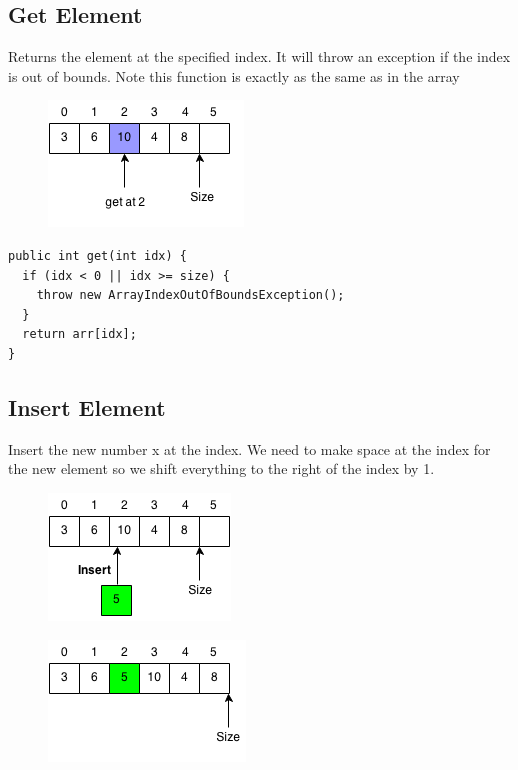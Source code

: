 \documentclass[11pt,oneside]{book}
\makeatletter
\def\maxwidth#1{\ifdim\Gin@nat@width>#1 #1\else\Gin@nat@width\fi}
\makeatother
\begin{document}
\subsection{Get Element}

Returns the element at the specified index. It will throw an exception if the index is out of bounds. Note this function is exactly as the same as in the array

\vspace{5px}\begin{figure}[H]\centering
        \includegraphics[width=0.66\maxwidth{\textwidth}]{vectorget.png}
        \end{figure}

\begin{lstlisting}
public int get(int idx) {
  if (idx < 0 || idx >= size) {
    throw new ArrayIndexOutOfBoundsException();
  }
  return arr[idx];
}
\end{lstlisting}

\subsection{Insert Element}

Insert the new number x at the index. We need to make space at the index for the new element so we shift everything to the right of the index by 1.

\vspace{5px}\begin{figure}[H]\centering
        \includegraphics[width=0.66\maxwidth{\textwidth}]{vectorinsert.png}
        \end{figure}

\vspace{5px}\begin{figure}[H]\centering
        \includegraphics[width=0.66\maxwidth{\textwidth}]{vectorinsert2.png}
        \end{figure}
\end{document}

